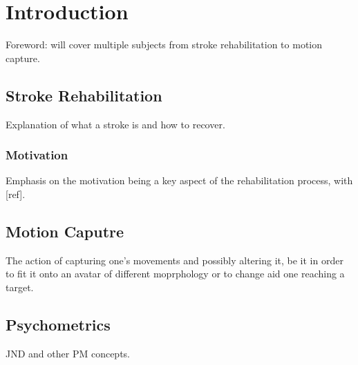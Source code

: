 
\chapter{Introduction} %

\label{Chapter1} %


Foreword: will cover multiple subjects from stroke rehabilitation to motion capture.

\section{Stroke Rehabilitation}

Explanation of what a stroke is and how to recover.

\subsection{Motivation}

Emphasis on the motivation being a key aspect of the rehabilitation process,
with [ref].

\section{Motion Caputre}

The action of capturing one's movements and possibly altering it, be it in order to fit
it onto an avatar of different moprphology or to change aid one reaching a target.

\section{Psychometrics}

JND and other PM concepts.
